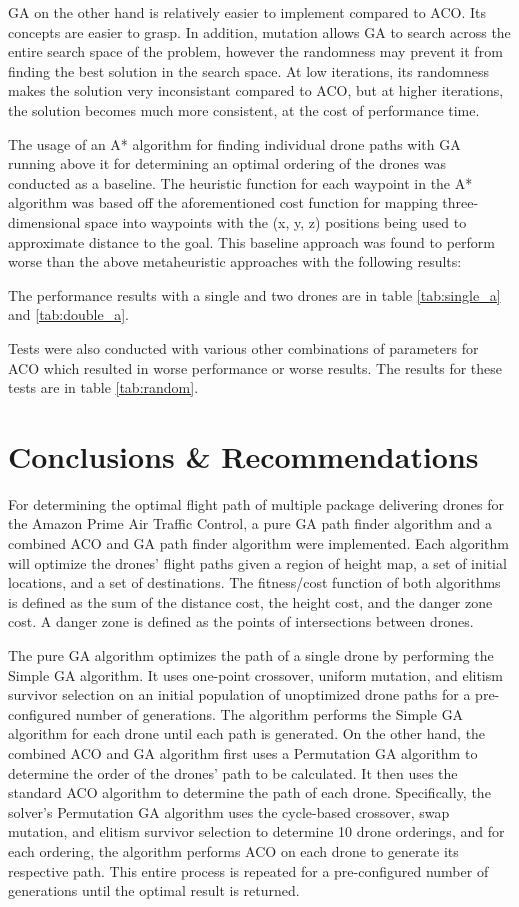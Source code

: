 \documentclass[conference]{IEEEtran}
\begin{document}
GA on the other hand is relatively easier to implement compared to ACO. Its concepts are easier to grasp. In addition, mutation allows GA to search across the entire search space of the problem, however the randomness may prevent it from finding the best solution in the search space. At low iterations, its randomness makes the solution very inconsistant compared to ACO, but at higher iterations, the solution becomes much more consistent, at the cost of performance time.

The usage of an A* algorithm for finding individual drone paths with GA running above it for determining an optimal ordering of the drones was conducted as a baseline. The heuristic function for each waypoint in the A* algorithm was based off the aforementioned cost function for mapping three-dimensional space into waypoints with the (x, y, z) positions being used to approximate distance to the goal. This baseline approach was found to perform worse than the above metaheuristic approaches with the following results:

The performance results with a single and two drones are in table \ref{tab:single_a} and \ref{tab:double_a}.

Tests were also conducted with various other combinations of parameters for ACO which resulted in worse performance or worse results. The results for these tests are in table \ref{tab:random}.

\section{Conclusions \& Recommendations}
For determining the optimal flight path of multiple package delivering drones for the Amazon Prime Air Traffic Control, a pure GA path finder algorithm and a combined ACO and GA path finder algorithm were implemented. Each algorithm will optimize the drones' flight paths given a region of height map, a set of initial locations, and a set of destinations. The fitness/cost function of both algorithms is defined as the sum of the distance cost, the height cost, and the danger zone cost. A danger zone is defined as the points of intersections between drones.

The pure GA algorithm optimizes the path of a single drone by performing the Simple GA algorithm. It uses one-point crossover, uniform mutation, and elitism survivor selection on an initial population of unoptimized drone paths for a pre-configured number of generations. The algorithm performs the Simple GA algorithm for each drone until each path is generated. On the other hand, the combined ACO and GA algorithm first uses a Permutation GA algorithm to determine the order of the drones' path to be calculated. It then uses the standard ACO algorithm to determine the path of each drone. Specifically, the solver's Permutation GA algorithm uses the cycle-based crossover, swap mutation, and elitism survivor selection to determine 10 drone orderings, and for each ordering, the algorithm performs ACO on each drone to generate its respective path. This entire process is repeated for a pre-configured number of generations until the optimal result is returned.
\end{document}
